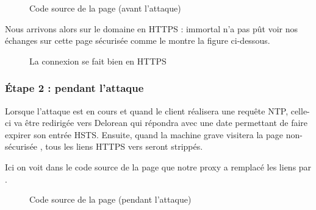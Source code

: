 \begin{figure}[H]
  \caption{Code source de la page (avant l'attaque)}
\end{figure}

Nous arrivons alors sur le domaine  en HTTPS : immortal n'a pas pût voir nos échanges sur cette page sécurisée comme le montre la figure ci-dessous.

\begin{figure}[H]
  \caption{La connexion se fait bien en HTTPS}
\end{figure}

\subsubsection{Étape 2 : pendant l'attaque}

Lorsque l'attaque est en cours et quand le client réalisera une requête NTP, celle-ci va être redirigée vers Delorean qui répondra avec une date permettant de faire expirer son entrée HSTS. Ensuite, quand la machine grave visitera la page non-sécurisée , tous les liens HTTPS vers  seront strippés.

Ici on voit dans le code source de la page que notre proxy a remplacé les liens  par .

\begin{figure}[H]
  \caption{Code source de la page (pendant l'attaque)}
\end{figure}

